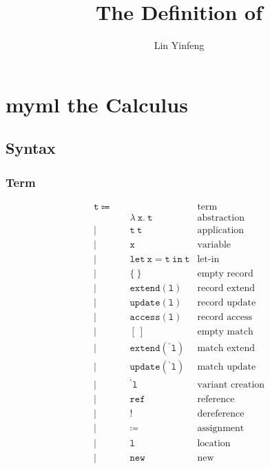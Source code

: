 \documentclass{report}
\title{The Definition of \theLang}
\author{Lin Yinfeng}
\newcommand{\theLang}{myml}
\newcommand{\code}{\mathtt}
\newcommand{\backtick}{{}^{\backprime}}
\begin{document}
\maketitle

\tableofcontents

\chapter{\theLang{} the Calculus}

\section{Syntax}

\subsection{Term}

\begin{align*}
\code{t} \Coloneqq \quad & & \text{term} \\
& \code{\lambda\ x.\ t} & \text{abstraction} \\
| \quad & \code{t\ t} & \text{application} \\
| \quad & \code{x} & \text{variable} \\
| \quad & \code{let\ x = t\ in\ t} & \text{let-in} \\
| \quad & \code{\{\ \}} & \text{empty record} \\
| \quad & \code{extend(l)} & \text{record extend} \\
| \quad & \code{update(l)} & \text{record update} \\
| \quad & \code{access(l)} & \text{record access} \\
| \quad & \code{[\ ]} & \text{empty match} \\
| \quad & \code{extend(\backtick l)} & \text{match extend} \\
| \quad & \code{update(\backtick l)} & \text{match update} \\
| \quad & \code{\backtick l} & \text{variant creation} \\
| \quad & \code{ref} & \text{reference} \\
| \quad & \code{!} & \text{dereference} \\
| \quad & \code{\coloneqq} & \text{assignment} \\
| \quad & \code{l} & \text{location} \\
| \quad & \code{new} & \text{new}
\end{align*}
\end{document}
